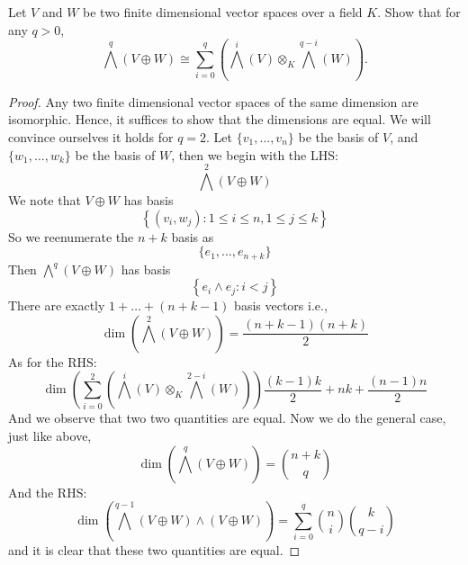 \documentclass[openany]{book}
\begin{document}
\begin{prob}
    Let \(V\) and \(W\) be two finite dimensional vector spaces over a field \(K\). Show that for any \(q>0\),
    \[\bigwedge^{q}(V\oplus W)\cong\sum_{i=0}^{q}(\bigwedge^{i}(V)\otimes_{K}\bigwedge^{q-i}(W)).\]
\end{prob}
\begin{proof}
    Any two finite dimensional vector spaces of the same dimension are isomorphic. Hence, it suffices to show that the dimensions are equal. We will convince ourselves it holds for $q=2$. Let $\{v_1,\dots, v_n\}$ be the basis of $V$, and $\{w_1,\dots,w_k\}$ be the basis of $W$, then we begin with the LHS:
    \begin{equation*}
        \bigwedge^{2}(V\oplus W)
    \end{equation*}
    We note that $V\oplus W$ has basis 
    \begin{equation*}
        \left\{(v_i,w_j):1\leq i\leq n, 1\leq j\leq k\right\}
    \end{equation*}
    So we reenumerate the $n+k$ basis as 
    \begin{equation*}
        \{e_1,\dots, e_{n+k}\}
    \end{equation*}
    Then $\bigwedge^{q}(V\oplus W)$ has basis
    \begin{equation*}
        \left\{ e_i\wedge e_j: i<j\right\}
    \end{equation*}
    There are exactly $1+\dots+(n+k-1)$ basis vectors i.e.,
    \begin{equation*}
        \dim\left(\bigwedge^{2}(V\oplus W)\right)=\frac{(n+k-1)(n+k)}{2}
    \end{equation*}
    As for the RHS: 
    \begin{equation*}
        \dim\left( \sum_{i=0}^{2}(\bigwedge^{i}(V)\otimes_{K}\bigwedge^{2-i}(W))\right)
        \frac{(k-1)k}{2}+nk+\frac{(n-1)n}{2}
    \end{equation*}
    And we observe that two two quantities are equal. Now we do the general case, just like above, 
    \begin{equation*}
        \dim\left(\bigwedge^{q}(V\oplus W)\right)=\binom{n+k}{q}
    \end{equation*}
    And the RHS:
    \begin{equation*}
        \dim\left(\bigwedge^{q-1}(V\oplus W)\wedge (V\oplus W)\right)=\sum_{i=0}^q\binom{n}{i}\binom{k}{q-i}
    \end{equation*}
    and it is clear that these two quantities are equal.
    

\end{proof}
\end{document}
